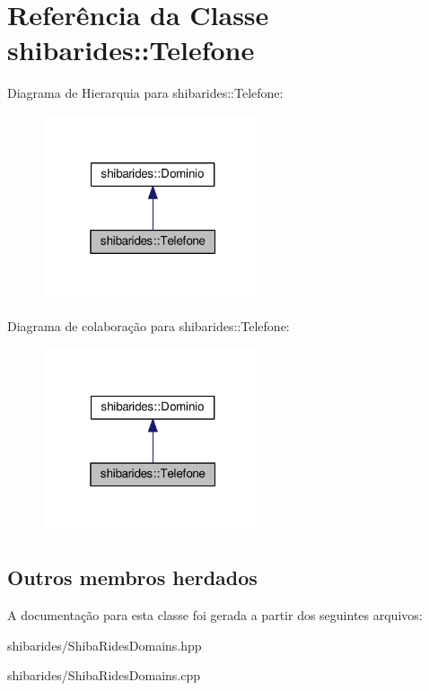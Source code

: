 \hypertarget{classshibarides_1_1Telefone}{}\section{Referência da Classe shibarides\+:\+:Telefone}
\label{classshibarides_1_1Telefone}


Diagrama de Hierarquia para shibarides\+:\+:Telefone\+:\nopagebreak
\begin{figure}[H]
\begin{center}
\leavevmode
\includegraphics[width=184pt]{classshibarides_1_1Telefone__inherit__graph}
\end{center}
\end{figure}


Diagrama de colaboração para shibarides\+:\+:Telefone\+:\nopagebreak
\begin{figure}[H]
\begin{center}
\leavevmode
\includegraphics[width=184pt]{classshibarides_1_1Telefone__coll__graph}
\end{center}
\end{figure}
\subsection*{Outros membros herdados}


A documentação para esta classe foi gerada a partir dos seguintes arquivos\+:\begin{DoxyCompactItemize}
\item 
shibarides/Shiba\+Rides\+Domains.\+hpp\item 
shibarides/Shiba\+Rides\+Domains.\+cpp\end{DoxyCompactItemize}
